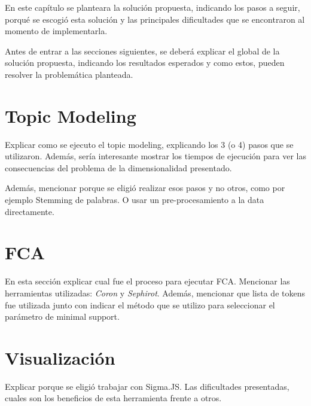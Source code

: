 En este capítulo se planteara la solución propuesta, indicando los pasos a seguir, porqué se escogió esta solución y las principales dificultades que se encontraron al momento de implementarla. 

Antes de entrar a las secciones siguientes, se deberá explicar el global de la solución propuesta, indicando los resultados esperados y como estos, pueden resolver la problemática planteada.

\section{Topic Modeling}
\label{sec:soltopicmodeling}
Explicar como se ejecuto el topic modeling, explicando los 3 (o 4) pasos que se utilizaron. Además, sería interesante mostrar los tiempos de ejecución para ver las consecuencias del problema de la dimensionalidad presentado.

Además, mencionar porque se eligió realizar esos pasos y no otros, como por ejemplo Stemming de palabras. O usar un pre-procesamiento a la data directamente.

\section{FCA}
\label{sec:solfca}
En esta sección explicar cual fue el proceso para ejecutar FCA. Mencionar las herramientas utilizadas: \emph{Coron} y \emph{Sephirot}. Además, mencionar que lista de tokens fue utilizada junto con indicar el método que se utilizo para seleccionar el parámetro de minimal support.

\section{Visualización}
\label{sec:solvisualization}
Explicar porque se eligió trabajar con Sigma.JS. Las dificultades presentadas, cuales son los beneficios de esta herramienta frente a otros.